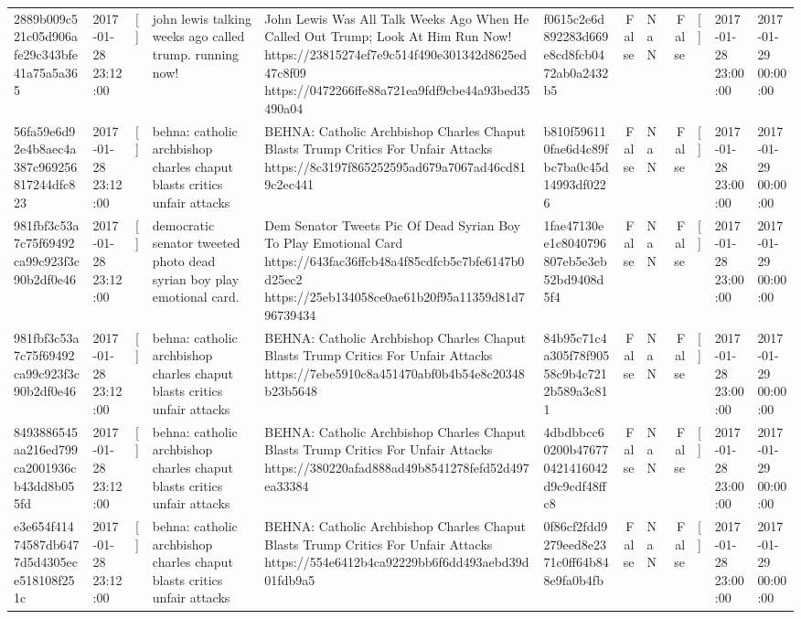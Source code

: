 \begin{tabular}{llllllrlrlll}
2889b009c521c05d906afe29c343bfe41a75a5a365 & 2017-01-28 23:12:00 & [] & john lewis talking weeks ago called trump. running now! & John Lewis Was All Talk Weeks Ago When He Called Out Trump; Look At Him Run Now! https://23815274ef7e9c514f490e301342d8625ed47c8f09 https://0472266ffe88a721ea9fdf9cbe44a93bed35490a04 & f0615c2e6d892283d669e8cd8fcb0472ab0a2432b5 & False & NaN & False & [] & 2017-01-28 23:00:00 & 2017-01-29 00:00:00 \\
56fa59e6d92e4b8aec4a387c969256817244dfc823 & 2017-01-28 23:12:00 & [] & behna: catholic archbishop charles chaput blasts critics unfair attacks & BEHNA: Catholic Archbishop Charles Chaput Blasts Trump Critics For Unfair Attacks https://8c3197f865252595ad679a7067ad46cd819c2ec441 & b810f596110fae6d4c89fbc7ba0c45d14993df0226 & False & NaN & False & [] & 2017-01-28 23:00:00 & 2017-01-29 00:00:00 \\
981fbf3c53a7c75f69492ca99c923f3c90b2df0e46 & 2017-01-28 23:12:00 & [] & democratic senator tweeted photo dead syrian boy play emotional card. & Dem Senator Tweets Pic Of Dead Syrian Boy To Play Emotional Card https://643fac36ffcb48a4f85cdfcb5c7bfe6147b0d25ec2 https://25eb134058ce0ae61b20f95a11359d81d796739434 & 1fae47130ee1c8040796807eb5e3eb52bd9408d5f4 & False & NaN & False & [] & 2017-01-28 23:00:00 & 2017-01-29 00:00:00 \\
981fbf3c53a7c75f69492ca99c923f3c90b2df0e46 & 2017-01-28 23:12:00 & [] & behna: catholic archbishop charles chaput blasts critics unfair attacks & BEHNA: Catholic Archbishop Charles Chaput Blasts Trump Critics For Unfair Attacks https://7ebe5910c8a451470abf0b4b54e8c20348b23b5648 & 84b95c71c4a305f78f90558c9b4c7212b589a3c811 & False & NaN & False & [] & 2017-01-28 23:00:00 & 2017-01-29 00:00:00 \\
8493886545aa216ed799ca2001936cb43dd8b055fd & 2017-01-28 23:12:00 & [] & behna: catholic archbishop charles chaput blasts critics unfair attacks & BEHNA: Catholic Archbishop Charles Chaput Blasts Trump Critics For Unfair Attacks https://380220afad888ad49b8541278fefd52d497ea33384 & 4dbdbbcc60200b476770421416042d9c9cdf48ffc8 & False & NaN & False & [] & 2017-01-28 23:00:00 & 2017-01-29 00:00:00 \\
e3e654f41474587db6477d5d4305ece518108f251c & 2017-01-28 23:12:00 & [] & behna: catholic archbishop charles chaput blasts critics unfair attacks & BEHNA: Catholic Archbishop Charles Chaput Blasts Trump Critics For Unfair Attacks https://554e6412b4ca92229bb6f6dd493aebd39d01fdb9a5 & 0f86cf2fdd9279eed8e2371c0ff64b848e9fa0b4fb & False & NaN & False & [] & 2017-01-28 23:00:00 & 2017-01-29 00:00:00 \\

\end{tabular}
